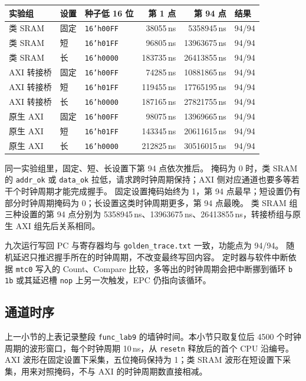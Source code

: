 \documentclass{article}
\begin{document}
\begin{center}
\small
\begin{tabular}{lllrrl}
\toprule
实验组 & 设置 & 种子低 16 位 & 第 1 点 & 第 94 点 & 结果 \\
\midrule
类 SRAM & 固定 & \texttt{16'h00FF} & 38055\,ns & 5358945\,ns & 94/94 \\
类 SRAM & 短 & \texttt{16'h01FF} & 96805\,ns & 13963675\,ns & 94/94 \\
类 SRAM & 长 & \texttt{16'h0000} & 183735\,ns & 26413855\,ns & 94/94 \\
AXI 转接桥 & 固定 & \texttt{16'h00FF} & 74285\,ns & 10881865\,ns & 94/94 \\
AXI 转接桥 & 短 & \texttt{16'h01FF} & 119455\,ns & 17765195\,ns & 94/94 \\
AXI 转接桥 & 长 & \texttt{16'h0000} & 187165\,ns & 27821755\,ns & 94/94 \\
原生 AXI & 固定 & \texttt{16'h00FF} & 98075\,ns & 13969665\,ns & 94/94 \\
原生 AXI & 短 & \texttt{16'h01FF} & 143345\,ns & 20611615\,ns & 94/94 \\
原生 AXI & 长 & \texttt{16'h0000} & 212825\,ns & 30516015\,ns & 94/94 \\
\bottomrule
\end{tabular}
\end{center}

同一实验组里，固定、短、长设置下第 94 点依次推后。
掩码为 0 时，类 SRAM 的 \texttt{addr\_ok} 或 \texttt{data\_ok} 拉低，请求跨时钟周期保持；AXI 侧对应通道也要多等若干个时钟周期才能完成握手。
固定设置掩码始终为 1，第 94 点最早；短设置仍有部分时钟周期掩码为 0；长设置这类时钟周期更多，第 94 点最晚。
类 SRAM 组三种设置的第 94 点分别为 5358945\,ns、13963675\,ns、26413855\,ns，转接桥组与原生 AXI 组先后关系相同。

九次运行写回 PC 与寄存器均与 \texttt{golden\_trace.txt} 一致，功能点为 94/94。
随机延迟只推迟握手所在的时钟周期，不改变最终写回内容。
定时器与软件中断依据 \texttt{mtc0} 写入的 Count、Compare 比较，多等出的时钟周期会把中断挪到循环 \texttt{b 1b} 或其延迟槽 \texttt{nop} 上另一次触发，EPC 仍指向该循环。

\subsection{通道时序}
上一小节的上表记录整段 \texttt{func\_lab9} 的墙钟时间。本小节只取复位后 4500 个时钟周期的波形窗口，每个时钟周期 10\,ns，从 \texttt{resetn} 释放后的首个 CPU 沿编号。
AXI 波形在固定设置下采集，五位掩码保持为 1；类 SRAM 波形在短设置下采集，用来对照掩码，不与 AXI 的时钟周期数直接相减。
\end{document}
